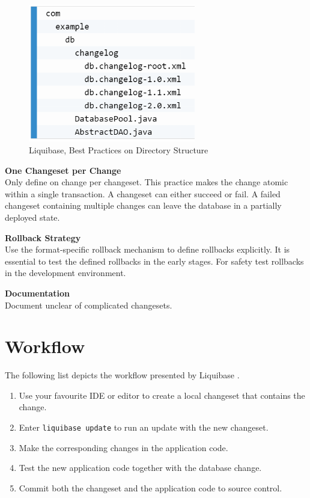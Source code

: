 \begin{figure}[H]
	\centering
	\includegraphics[width=0.65\textwidth]{./chapters/intro_liquibase/images/directory_structure.png}
	\caption[Liquibase, Best Practices on Directory Structure - Source: \cite{Liquibase}]{Liquibase, Best Practices on Directory Structure}
	\label{fig:IntroductionToLiquibase:BestPrac}
\end{figure}

\textbf{One Changeset per Change}\\
%
Only define on change per changeset. This practice makes the change atomic within a single transaction. A changeset can either succeed or fail. A failed changeset containing multiple changes can leave the database in a partially deployed state.

\textbf{Rollback Strategy}\\
%
Use the format-specific rollback mechanism to define rollbacks explicitly. It is essential to test the defined rollbacks in the early stages. For safety test rollbacks in the development environment.

\textbf{Documentation}\\
%
Document unclear of complicated changesets.

\section{Workflow}
%
The following list depicts the workflow presented by Liquibase \cite{Liquibase}. 

\begin{enumerate}
	\item Use your favourite IDE or editor to create a local changeset that contains the change.
	\item Enter \texttt{liquibase update} to run an update with the new changeset.
	\item Make the corresponding changes in the application code.
	\item Test the new application code together with the database change.
	\item Commit both the changeset and the application code to source control.
\end{enumerate}

\newpage